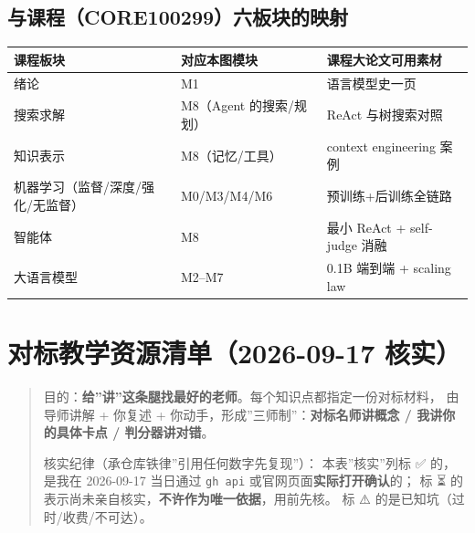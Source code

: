 \documentclass[
  chinese,
  11pt,
]{ctexart}
\newcounter{none} %
\begin{document}
\subsection{与课程（CORE100299）六板块的映射}\label{ux4e0eux8bfeux7a0bcore100299ux516dux677fux5757ux7684ux6620ux5c04}

{\def\LTcaptype{none} %
\begin{longtable}[]{@{}
  >{\raggedright\arraybackslash}p{}
  >{\raggedright\arraybackslash}p{}
  >{\raggedright\arraybackslash}p{}@{}}
\toprule\noalign{}
\begin{minipage}[b]{\linewidth}\raggedright
课程板块
\end{minipage} & \begin{minipage}[b]{\linewidth}\raggedright
对应本图模块
\end{minipage} & \begin{minipage}[b]{\linewidth}\raggedright
课程大论文可用素材
\end{minipage} \\
\midrule\noalign{}
\endhead
\bottomrule\noalign{}
\endlastfoot
绪论 & M1 & 语言模型史一页 \\
搜索求解 & M8（Agent 的搜索/规划） & ReAct 与树搜索对照 \\
知识表示 & M8（记忆/工具） & context engineering 案例 \\
机器学习（监督/深度/强化/无监督） & M0/M3/M4/M6 & 预训练+后训练全链路 \\
智能体 & M8 & 最小 ReAct + self-judge 消融 \\
大语言模型 & M2--M7 & 0.1B 端到端 + scaling law \\
\end{longtable}
}

\newpage

\section{对标教学资源清单（2026-09-17 核实）}\label{ux5bf9ux6807ux6559ux5b66ux8d44ux6e90ux6e05ux53552026-09-17-ux6838ux5b9e}

\begin{quote}
目的：\textbf{给''讲''这条腿找最好的老师}。每个知识点都指定一份对标材料， 由导师讲解 + 你复述 + 你动手，形成''三师制''：\textbf{对标名师讲概念 / 我讲你的具体卡点 / 判分器讲对错}。

核实纪律（承仓库铁律''引用任何数字先复现''）： 本表''核实''列标 ✅ 的，是我在 2026-09-17 当日通过 \texttt{gh\ api} 或官网页面\textbf{实际打开确认}的； 标 ⏳ 的表示尚未亲自核实，\textbf{不许作为唯一依据}，用前先核。 标 ⚠️ 的是已知坑（过时/收费/不可达）。
\end{quote}
\end{document}
